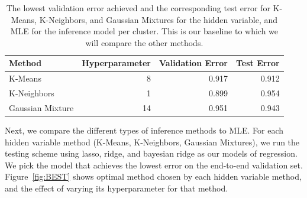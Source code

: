 \documentclass[11pt]{article}
\begin{document}
\begin{table}[h!]
    \begin{tabularx}{0.9\textwidth}{| X | r | r | r | }
        \hline
        Method & Hyperparameter & Validation Error & Test Error \\
        \hline
        K-Means & 8 & 0.917 & 0.912 \\
        K-Neighbors & 1 & 0.899 & 0.954 \\
        Gaussian Mixture & 14 & 0.951 & 0.943\\
        \hline
    \end{tabularx}
    \caption{The lowest validation error achieved and the corresponding test error for K-Means, K-Neighbors, and Gaussian Mixtures for the hidden variable, and MLE for the inference model per cluster. This is our baseline to which we will compare the other methods.}
    \label{tab:baseline}
\end{table}

Next, we compare the different types of inference methods to MLE. For each hidden variable method (K-Means, K-Neighbors, Gaussian Mixtures), we run the testing scheme using lasso, ridge, and bayesian ridge as our models of regression. We pick the model that achieves the lowest error on the end-to-end validation set. Figure~\ref{fig:BEST} shows optimal method chosen by each hidden variable method, and the effect of varying its hyperparameter for that method. 
\end{document}
